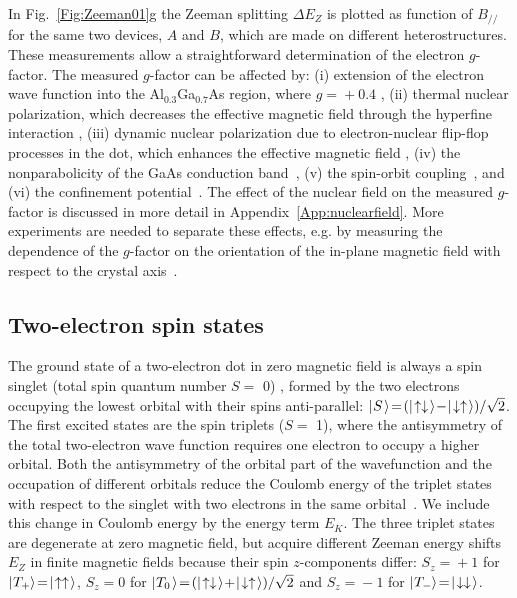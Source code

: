 \documentclass[rmp,twocolumn,aps]{revtex4}
\begin{document}
In Fig.~\ref{Fig:Zeeman01}g the Zeeman splitting $\Delta E_Z$ is
plotted as function of $B_{//}$  for the same two devices, $A$ and
$B$, which are made on different heterostructures. These
measurements allow a straightforward determination of the electron
$g$-factor. The measured $g$-factor can be affected by: (i)
extension of the electron wave function into the
Al$_{0.3}$Ga$_{0.7}$As region, where $g\!=\!+0.4$
\cite{Snelling,salis01}, (ii) thermal nuclear polarization,
which decreases the effective magnetic field through the hyperfine
interaction \cite{BookOptical}, (iii) dynamic nuclear polarization
due to electron-nuclear flip-flop processes in the dot, which
enhances the effective magnetic field \cite{BookOptical}, (iv) the
nonparabolicity of the GaAs conduction band~\cite{Snelling}, (v)
the spin-orbit coupling~\cite{falko05}, and (vi) the confinement
potential~\cite{ WeisbuchPRB77,BjorkPRB05}. The effect of the
nuclear field on the measured $g$-factor is discussed in more
detail in Appendix~\ref{App:nuclearfield}. More experiments are
needed to separate these effects, e.g. by measuring the dependence
of the $g$-factor on the orientation of the in-plane magnetic
field with respect to the crystal axis~\cite{falko05}.


\subsection{Two-electron spin states}

The ground state of a two-electron dot in zero magnetic field is
always a spin singlet (total spin quantum number $S\!=\!$ 0)
\cite{ashcroft}, formed by the two electrons occupying the lowest
orbital with their spins anti-parallel:
$\ket{\:S}\!=\!(\ket{\ua\da}\!-\!\ket{\da\ua})/\sqrt{2}$. The
first excited states are the spin triplets ($S\!=\!$ 1), where the
antisymmetry of the total two-electron wave function requires one
electron to occupy a higher orbital. Both the antisymmetry of the
orbital part of the wavefunction and the occupation of different
orbitals reduce the Coulomb energy of the triplet states with
respect to the singlet with two electrons in the same
orbital~\cite{kouwenhoven01}. We include this change in Coulomb energy
by the energy term $E_K$. The three triplet states are
degenerate at zero magnetic field, but acquire different Zeeman
energy shifts $E_{Z}$ in finite magnetic fields because their spin
$z$-components differ: $S_z\!=\!+1$ for
$\mbox{$|\!\:T_{+\!}\;\!\rangle$}\!=\!\mbox{$|\!\uparrow\uparrow\;\!\rangle$}$, $S_z\!=\!0$ for
$\ket{\:T_{0}}\!=\!(\ket{\ua\da}\!+\!\ket{\da\ua})/\sqrt{2}$ and
$S_z\!=\!-1$ for $\mbox{$|\!\:T_{-\!}\;\!\rangle$}\!=\!\mbox{$|\!\downarrow\downarrow\;\!\rangle$}$.
\end{document}
